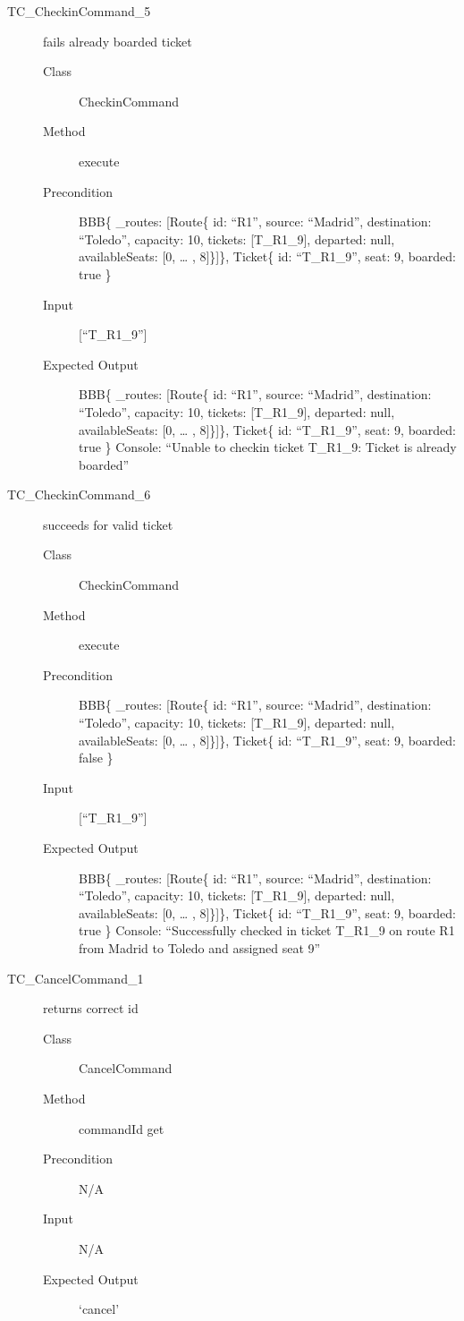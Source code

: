 \documentclass[11pt]{article}
\begin{document}
\begin{description}
\item[{TC\_CheckinCommand\_5}] fails already boarded ticket
\begin{description}
\item[{Class}] CheckinCommand
\item[{Method}] execute
\item[{Precondition}] BBB\{ \_routes: [Route\{ id: “R1”, source: “Madrid”, destination: “Toledo”, capacity: 10,  tickets: [T\_R1\_9], departed: null, availableSeats: [0, … , 8]\}]\}, Ticket\{ id: “T\_R1\_9”, seat: 9, boarded: true \}
\item[{Input}] [“T\_R1\_9”]
\item[{Expected Output}] BBB\{ \_routes: [Route\{ id: “R1”, source: “Madrid”, destination: “Toledo”, capacity: 10,  tickets: [T\_R1\_9], departed: null, availableSeats: [0, … , 8]\}]\}, Ticket\{ id: “T\_R1\_9”, seat: 9, boarded: true \}
Console: “Unable to checkin ticket T\_R1\_9: Ticket is already boarded”
\end{description}
\end{description}


\begin{description}
\item[{TC\_CheckinCommand\_6}] succeeds for valid ticket
\begin{description}
\item[{Class}] CheckinCommand
\item[{Method}] execute
\item[{Precondition}] BBB\{ \_routes: [Route\{ id: “R1”, source: “Madrid”, destination: “Toledo”, capacity: 10,  tickets: [T\_R1\_9], departed: null, availableSeats: [0, … , 8]\}]\}, Ticket\{ id: “T\_R1\_9”, seat: 9, boarded: false \}
\item[{Input}] [“T\_R1\_9”]
\item[{Expected Output}] BBB\{ \_routes: [Route\{ id: “R1”, source: “Madrid”, destination: “Toledo”, capacity: 10,  tickets: [T\_R1\_9], departed: null, availableSeats: [0, … , 8]\}]\}, Ticket\{ id: “T\_R1\_9”, seat: 9, boarded: true \}
Console: “Successfully checked in ticket T\_R1\_9 on route R1 from Madrid to Toledo and assigned seat 9”
\end{description}
\end{description}



\begin{description}
\item[{TC\_CancelCommand\_1}] returns correct id
\begin{description}
\item[{Class}] CancelCommand
\item[{Method}] commandId get
\item[{Precondition}] N/A
\item[{Input}] N/A
\item[{Expected Output}] ‘cancel’
\end{description}
\end{description}
\end{document}

